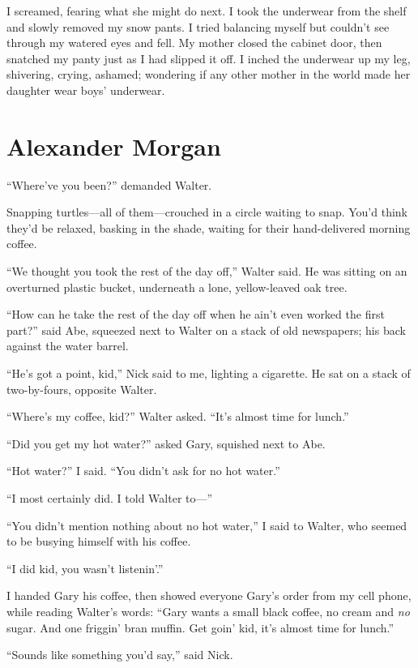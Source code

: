 I screamed, fearing what she might do next. I took the underwear from
the shelf and slowly removed my snow pants. I tried balancing myself but
couldn't see through my watered eyes and fell. My mother closed the
cabinet door, then snatched my panty just as I had slipped it off. I
inched the underwear up my leg, shivering, crying, ashamed; wondering if
any other mother in the world made her daughter wear boys' underwear.

\chapter{Alexander Morgan}

\titlemark

``Where've you been?'' demanded Walter.

Snapping turtles---all of them---crouched in a circle waiting to snap.
You'd think they'd be relaxed, basking in the shade, waiting for their
hand-delivered morning coffee.

``We thought you took the rest of the day off,'' Walter said. He was
sitting on an overturned plastic bucket, underneath a lone,
yellow-leaved oak tree.

``How can he take the rest of the day off when he ain't even worked the
first part?'' said Abe, squeezed next to Walter on a stack of old
newspapers; his back against the water barrel.

``He's got a point, kid,'' Nick said to me, lighting a cigarette. He sat
on a stack of two-by-fours, opposite Walter.

``Where's my coffee, kid?'' Walter asked. ``It's almost time for
lunch.''

``Did you get my hot water?'' asked Gary, squished next to Abe.

``Hot water?'' I said. ``You didn't ask for no hot water.''

``I most certainly did. I told Walter to---''

``You didn't mention nothing about no hot water,'' I said to Walter, who
seemed to be busying himself with his coffee.

``I did kid, you wasn't listenin'.''

I handed Gary his coffee, then showed everyone Gary's order from my cell
phone, while reading Walter's words: ``Gary wants a small black coffee,
no cream and \emph{no} sugar. And one friggin' bran muffin. Get goin'
kid, it's almost time for lunch.''

``Sounds like something you'd say,'' said Nick.

